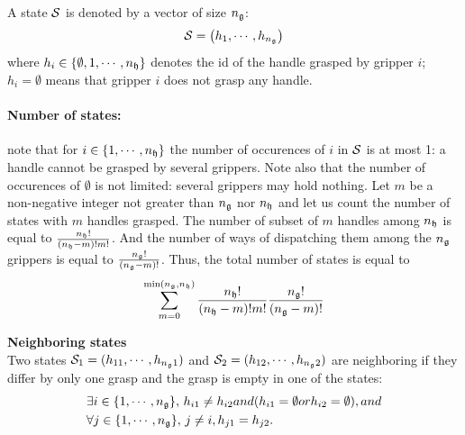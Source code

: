 A state $\mathcal{S}$ is denoted by a vector of size $n_{\mathfrak{g}}$:
\begin{equation}\label{eq:state}
\state = \left(h_1,\cdots,h_{\ngrippers}\right)
\end{equation}
where $h_i\in\{\emptyset,1,\cdots,n_{\mathfrak{h}}\}$ denotes the id of the handle grasped by gripper $i$; $h_i=\emptyset$ means that gripper $i$ does not grasp any handle.

\paragraph{Number of states:} note that for $i\in\{1,\cdots,n_{\mathfrak{h}}\}$ the number of occurences of $i$ in $\mathcal{S}$ is at most 1: a handle cannot be grasped by several grippers. Note also that the number of occurences of $\emptyset$ is not limited: several grippers may hold nothing. Let $m$ be a non-negative integer not greater than $n_{\mathfrak{g}}$ nor $n_{\mathfrak{h}}$ and let us count the number of states with $m$ handles grasped. The number of subset of $m$ handles among $n_{\mathfrak{h}}$ is equal to $\frac{n_{\mathfrak{h}}!}{(n_{\mathfrak{h}}-m)!m!}$. And the number of ways of dispatching them among the $n_{\mathfrak{g}}$ grippers is equal to $\frac{n_{\mathfrak{g}}!}{(n_{\mathfrak{g}}-m)!}$. Thus, the total number of states is equal to
$$
\sum_{m=0}^{\min(n_{\mathfrak{g}},n_{\mathfrak{h}})} \frac{n_{\mathfrak{h}}!}{(n_{\mathfrak{h}}-m)!m!} \frac{n_{\mathfrak{g}}!}{(n_{\mathfrak{g}}-m)!}
$$
\begin{definition}\label{def:neighboring-states}\textbf{Neighboring states}\\
  Two states $\mathcal{S}_1=(h_{1 1},\cdots,h_{n_{\mathfrak{g}} 1})$ and $\mathcal{S}_2=(h_{1 2},\cdots,h_{n_{\mathfrak{g}} 2})$ are neighboring if they differ by only one grasp and the grasp is empty in one of the states:
  \begin{align*}
    &\exists i\in\{1,\cdots,n_{\mathfrak{g}}\},\,h_{i 1} \not= h_{i 2} \relax{ and } (h_{i 1}=\emptyset \relax{ or } h_{i 2}=\emptyset), \relax{ and }\\
    &\forall j\in\{1,\cdots,n_{\mathfrak{g}}\},\, j\not=i,h_{j 1} = h_{j 2}.
  \end{align*}
\end{definition}
